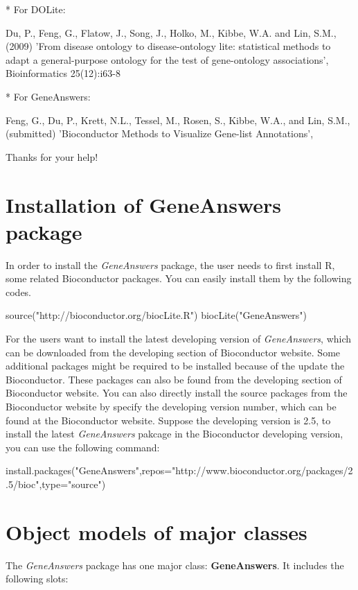 \documentclass[a4paper]{article}
\newcommand{\Rpackage}[1]{{\textit{#1}}}
\begin{document}
* For DOLite:

Du, P., Feng, G., Flatow, J., Song, J., Holko, M., Kibbe, W.A. and Lin, S.M., (2009) 'From disease ontology to disease-ontology lite: statistical methods to adapt a general-purpose ontology for the test of gene-ontology associations', Bioinformatics 25(12):i63-8


* For GeneAnswers:

Feng, G., Du, P., Krett, N.L., Tessel, M., Rosen, S., Kibbe, W.A., and Lin, S.M., (submitted) 'Bioconductor Methods to Visualize Gene-list Annotations', 

Thanks for your help!

\section{Installation of GeneAnswers package}
In order to install the \Rpackage{GeneAnswers} package, the user needs to first install R, some related Bioconductor packages. You can easily install them by the following codes.

\begin{Sinput} 
source("http://bioconductor.org/biocLite.R")
biocLite("GeneAnswers")
\end{Sinput}

For the users want to install the latest developing version of \Rpackage{GeneAnswers}, which can be downloaded from the developing section of Bioconductor website. Some additional packages might be required to be installed because of the update the Bioconductor. These packages can also be found from the developing section of Bioconductor website. You can also directly install the source packages from the Bioconductor website by specify the developing version number, which can be found at the Bioconductor website. Suppose the developing version is 2.5, to
install the latest \Rpackage{GeneAnswers} pakcage in the Bioconductor developing version, you can use the following command:

\begin{Sinput}
install.packages("GeneAnswers",repos="http://www.bioconductor.org/packages/2.5/bioc",type="source")
\end{Sinput} 

\section{Object models of major classes}
The \Rpackage{GeneAnswers} package has one major class: {\bf GeneAnswers}. It includes the following slots:
\end{document}
